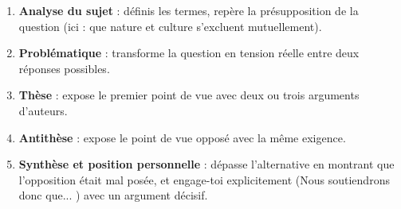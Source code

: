 \documentclass[11pt]{article}
\begin{document}
\begin{methode}
\begin{enumerate}
\item \textbf{Analyse du sujet} : définis les termes, repère la présupposition de la question (ici : que nature et culture s'excluent mutuellement).
\item \textbf{Problématique} : transforme la question en tension réelle entre deux réponses possibles.
\item \textbf{Thèse} : expose le premier point de vue avec deux ou trois arguments d'auteurs.
\item \textbf{Antithèse} : expose le point de vue opposé avec la même exigence.
\item \textbf{Synthèse et position personnelle} : dépasse l'alternative en montrant que l'opposition était mal posée, et engage-toi explicitement (\guillemotleft Nous soutiendrons donc que... \guillemotright) avec un argument décisif.
\end{enumerate}
\end{methode}
\end{document}
